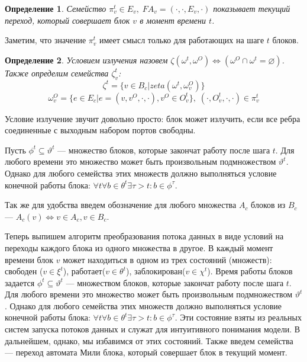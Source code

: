 \documentclass[10pt,a4paper]{article}
\newtheorem{defen}{Определение}
\newcommand{\FA}{F\!A}
\begin{document}
\begin{defen}
  Семейство $\pi^t_v \in E_v, \; \FA_v = (\cdot, \cdot, E_v, \cdot)$ показывает текущий переход, который совершает блок $v$ в момент времени $t$.
\end{defen}
Заметим, что значение $\pi^t_v$ имеет смысл только для работающих на шаге $t$ блоков.

\begin{defen}
  Условием излучения назовем $\zeta(\omega^t, \omega^O) \Leftrightarrow (\omega^O \cap \omega^t = \varnothing)$.
  Также определим семейства $\zeta^t_v$:
  $$\zeta^t = \{ v \in B_c \vert zeta(\omega^t, \omega^O_v) \}$$
  $$\omega^O_v = \{ e \in E_c \vert e = (v, v^O, \cdot, \cdot), v^O \in O^t_v \}, \; (\cdot, O^t_v, \cdot, \cdot) \in \pi^t_v$$
\end{defen}
Условие излучение звучит довольно просто: блок может излучить, если все ребра соединенные с выходным набором портов свободны.

Пусть $\phi^t \subseteq \vartheta^t$ --- множество блоков, которые закончат работу после шага $t$. Для любого времени это множество может быть произвольным подмножеством $\vartheta^t$.
Однако для любого семейства этих множеств должно выполняться условие конечной работы блока: $\forall t \forall b \in \theta^t \exists \tau > t: b \in \phi^{\tau}$.

Так же для удобства введем обозначение для любого множества $A_c$ блоков из $B_c$ --- $A_c(v) \Leftrightarrow v \in A_c, v \in B_c$.

Теперь выпишем алгоритм преобразования потока данных в виде условий на переходы каждого блока из одного множества в другое.
В каждый момент времени блок $v$ может находиться в одном из трех состояний (множеств): свободен ($v \in \xi^t$), работает($v \in \theta^t$), заблокирован($v \in \chi^t$).
Время работы блоков задается $\phi^t \subseteq \vartheta^t$ --- множеством блоков, которые закончат работу после шага $t$. Для любого времени это множество может быть произвольным подмножеством $\vartheta^t$. Однако для любого семейства этих множеств должно выполняться условие конечной работы блока: $\forall t \forall b \in \theta^t \exists \tau > t: b \in \phi^{\tau}$.
Эти состояние взяты из реальных систем запуска потоков данных и служат для интуитивного понимания модели. В дальнейшем, однако, мы избавимся от этих состояний.
Также введем семейства  --- переход автомата Мили блока, который совершает блок в текущий момент.
\end{document}
